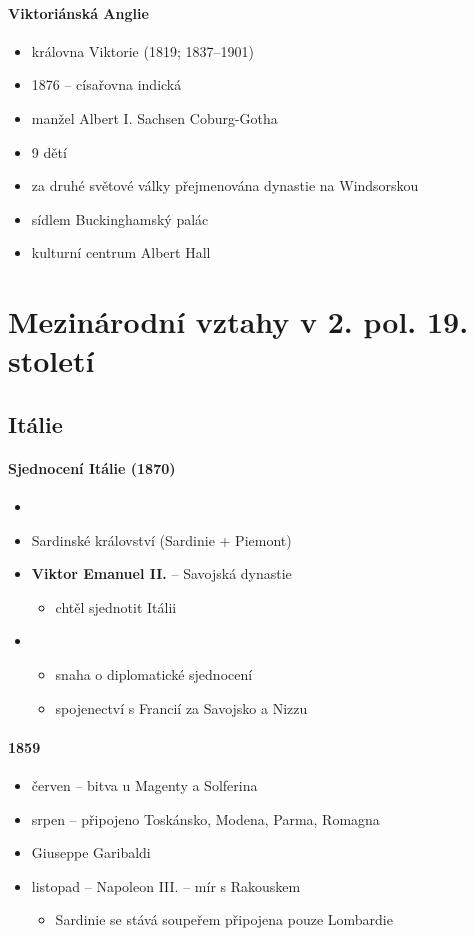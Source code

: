 \paragraph{Viktoriánská Anglie}
\begin{itemize}
\item královna Viktorie (1819; 1837--1901)
\item 1876 -- císařovna indická
\item manžel Albert I. Sachsen Coburg-Gotha
\item 9 dětí
\item za druhé světové války přejmenována dynastie na Windsorskou
\item sídlem Buckinghamský palác
\item kulturní centrum Albert Hall
\end{itemize}

\section{Mezinárodní vztahy v 2. pol. 19. století}
\subsection{Itálie}
\paragraph{Sjednocení Itálie (1870)}
\begin{itemize}
\item {}
\item Sardinské království (Sardinie + Piemont)
\item \textbf{Viktor Emanuel II.} -- Savojská dynastie
	\begin{itemize}
	\item chtěl sjednotit Itálii
	\end{itemize}
\item {}
	\begin{itemize}
	\item snaha o diplomatické sjednocení
	\item[\ra] spojenectví s Francií za Savojsko a Nizzu
	\end{itemize}
\end{itemize}

\paragraph{1859}
\begin{itemize}
\item červen -- bitva u Magenty a Solferina
\item srpen -- připojeno Toskánsko, Modena, Parma, Romagna
\item Giuseppe Garibaldi
\item listopad -- Napoleon III. -- mír s Rakouskem 
	\begin{itemize}
	\item Sardinie se stává soupeřem \ra připojena pouze Lombardie
	\end{itemize}
\end{itemize}


